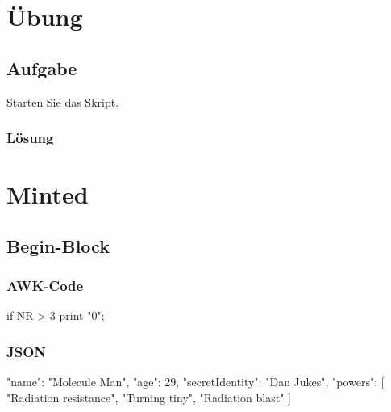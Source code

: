 \section{Übung}
\label{sec:uebung_01}

\subsection{Aufgabe}
\label{sec:uebung_01.aufgabe_01}
Starten Sie das Skript.

\subsubsection*{Lösung}
\label{sec:uebung_01.aufgabe_01.loesung}


\section{Minted}

\subsection{Begin-Block}

\subsubsection{AWK-Code}
\begin{awkcode}
  if NR > 3 {
    print "0";
  }
\end{awkcode}

\subsubsection{JSON}
\begin{jsoncode}
  {
    "name": "Molecule Man",
    "age": 29,
    "secretIdentity": "Dan Jukes",
    "powers": [
      "Radiation resistance",
      "Turning tiny",
      "Radiation blast"
    ]
  }
\end{jsoncode}

